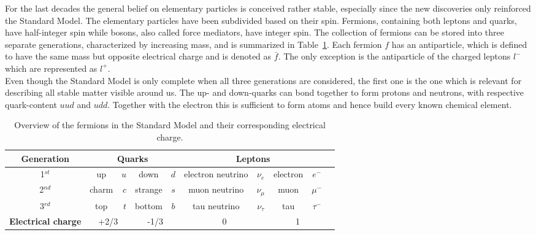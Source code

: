 For the last decades the general belief on elementary particles is conceived rather stable, especially since the new discoveries only reinforced the Standard Model. %
The elementary particles have been subdivided based on their spin. Fermions, containing both leptons and quarks, have half-integer spin while bosons, also called force mediators, have integer spin. 
The collection of fermions can be stored into three separate generations, characterized by increasing mass, and is summarized in Table~\ref{table::ElemParticles}.  Each fermion $f$ has an antiparticle, which is defined to have the same mass but opposite electrical charge and is denoted as $\bar{f}$. The only exception is the antiparticle of the charged leptons $l^{-}$ which are represented as $l^{+}$.\\
Even though the Standard Model is only complete when all three generations are considered, the first one is the one which is relevant for describing all stable matter visible around us.
The up- and down-quarks can bond together to form protons and neutrons, with respective quark-content $uud$ and $udd$. Together with the electron this is sufficient to form atoms and hence build every known chemical element.
\setlength\extrarowheight{5pt}
\begin{table}[h!t]
 \centering
 \caption{Overview of the fermions in the Standard Model and their corresponding electrical charge.} \label{table::ElemParticles}
 \begin{tabular}{|c|cr|cc|cc|cc|c|}
  \hline
  \textbf{Generation} 		& \multicolumn{4}{c|}{\textbf{Quarks}} 				& \multicolumn{4}{c|}{\textbf{Leptons}} 				\\
  \hline
  1$^{st}$ 			& up 		& $u$ 		& down 		& $d$ 		& electron neutrino	& $\nu_{e}$ 	& electron	& $e^{-}$ 	\\
  \hline
  2$^{nd}$ 			& charm 	& $c$ 		& strange 	& $s$		& muon neutrino		& $\nu_{\mu}$ 	& muon		& $\mu^{-}$ 	\\
  \hline
  3$^{rd}$ 			& top		& $t$ 		& bottom 	& $b$ 		& tau neutrino 		& $\nu_{\tau}$ 	& tau		& $\tau^{-}$ 	\\
  \hline
  \hline
  \textbf{Electrical charge} 	& \multicolumn{2}{c|}{+2/3} 	& \multicolumn{2}{c|}{-1/3} 	& \multicolumn{2}{c|}{0} 		& \multicolumn{2}{c|}{1}	\\
  \hline
 \end{tabular}
\end{table}

